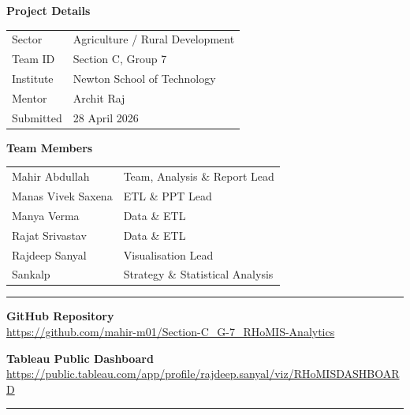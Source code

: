 \documentclass[11pt,a4paper]{article}
\begin{document}
\begin{titlepage}
\noindent
\begin{minipage}[t]{0.48\linewidth}
  {\small\bfseries\color{rhoCharcoal}Project Details}\\[6pt]
  \begin{tabular}{@{}ll@{}}
    \small Sector     & \small Agriculture / Rural Development \\[3pt]
    \small Team ID    & \small Section C, Group 7 \\[3pt]
    \small Institute  & \small Newton School of Technology \\[3pt]
    \small Mentor     & \small Archit Raj \\[3pt]
    \small Submitted  & \small 28 April 2026 \\
  \end{tabular}
\end{minipage}%
\hfill
\begin{minipage}[t]{0.48\linewidth}
  {\small\bfseries\color{rhoCharcoal}Team Members}\\[6pt]
  \begin{tabular}{@{}ll@{}}
    \small Mahir Abdullah     & \small Team, Analysis \& Report Lead \\[2pt]
    \small Manas Vivek Saxena & \small ETL \& PPT Lead \\[2pt]
    \small Manya Verma        & \small Data \& ETL \\[2pt]
    \small Rajat Srivastav    & \small Data \& ETL \\[2pt]
    \small Rajdeep Sanyal     & \small Visualisation Lead \\[2pt]
    \small Sankalp            & \small Strategy \& Statistical Analysis \\
  \end{tabular}
\end{minipage}

\vspace{0.65cm}
{\color{rhoRule}\rule{\linewidth}{0.6pt}}
\vspace{0.5cm}

\noindent
{\small\bfseries\color{rhoCharcoal}GitHub Repository}\\[3pt]
\href{https://github.com/mahir-m01/Section-C\_G-7\_RHoMIS-Analytics}%
{\small\color{rhoRed}https://github.com/mahir-m01/Section-C\_G-7\_RHoMIS-Analytics}

\vspace{0.4cm}
{\small\bfseries\color{rhoCharcoal}Tableau Public Dashboard}\\[3pt]
\href{https://public.tableau.com/app/profile/rajdeep.sanyal/viz/RHoMISDASHBOARD/INCOMEPOSITION}%
{\small\color{rhoRed}https://public.tableau.com/app/profile/rajdeep.sanyal/viz/RHoMISDASHBOARD}

\vfill
{\color{rhoRed}\rule{\linewidth}{4pt}}
\end{titlepage}
\end{document}
